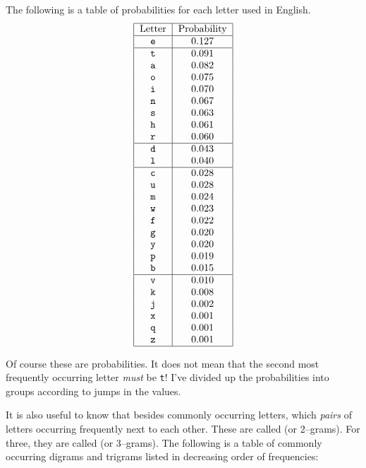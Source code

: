 The following is a table of probabilities for each letter used in
English.
\[
 \begin{tabular}{|c|c|}
   \hline
   Letter & Probability \\
   \hline
   \texttt{e} &  0.127 \\ \hline
   \texttt{t} &  0.091 \\
   \texttt{a} &  0.082 \\
   \texttt{o} &  0.075 \\
   \texttt{i} &  0.070 \\
   \texttt{n} &  0.067 \\
   \texttt{s} &  0.063 \\
   \texttt{h} &  0.061 \\
   \texttt{r} &  0.060 \\ \hline
   \texttt{d} &  0.043 \\
   \texttt{l} &  0.040 \\ \hline
   \texttt{c} &  0.028 \\
   \texttt{u} &  0.028 \\
   \texttt{m} &  0.024 \\
   \texttt{w} &  0.023 \\
   \texttt{f} &  0.022 \\
   \texttt{g} &  0.020 \\
   \texttt{y} &  0.020 \\
   \texttt{p} &  0.019 \\
   \texttt{b} &  0.015 \\ \hline
   \texttt{v} &  0.010 \\
   \texttt{k} &  0.008 \\
   \texttt{j} &  0.002 \\
   \texttt{x} &  0.001 \\
   \texttt{q} &  0.001 \\
   \texttt{z} &  0.001 \\
   \hline
 \end{tabular}
\]

Of course these are probabilities. It does not mean that the
second most frequently occurring letter
\textit{must} be \texttt{t}!
I've divided up the probabilities into groups according to jumps
in the values.

It is also useful to know that besides commonly occurring letters,
which \textit{pairs} of letters occurring frequently next to each
other. These are called
(or 2--grams). For three,
they are called
(or 3--grams).
The following is a
table of commonly occurring digrams and trigrams listed in
decreasing order of frequencies:

